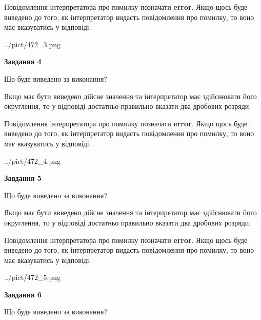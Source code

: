 \documentclass[12pt, ukrainian]{article}
\begin{document}
{\begin {Large}
Повідомлення інтерпретатора про помилку позначати \textbf{error}.
Якщо щось буде виведено до того, як інтерпретатор видасть повідомлення про помилку, 
то воно має вказуватись у відповіді. \par

\begin{center}
	{../pict/472_3.png}
\end{center}
\newpage

{\begin {center}\textbf{Завдання 4}\end {center}}\par
Що буде виведено за виконання? \par

Якщо має бути виведено дійсне значення та інтерпретатор має здійснювати його округлення, 
то у відповіді достатньо правильно вказати два дробових розряди.

Повідомлення інтерпретатора про помилку позначати \textbf{error}.
Якщо щось буде виведено до того, як інтерпретатор видасть повідомлення про помилку, 
то воно має вказуватись у відповіді. \par

\begin{center}
	{../pict/472_4.png}
\end{center}
\newpage

{\begin {center}\textbf{Завдання 5}\end {center}}\par
Що буде виведено за виконання? \par

Якщо має бути виведено дійсне значення та інтерпретатор має здійснювати його округлення, 
то у відповіді достатньо правильно вказати два дробових розряди.

Повідомлення інтерпретатора про помилку позначати \textbf{error}.
Якщо щось буде виведено до того, як інтерпретатор видасть повідомлення про помилку, 
то воно має вказуватись у відповіді. \par

\begin{center}
	{../pict/472_5.png}
\end{center}
\newpage

{\begin {center}\textbf{Завдання 6}\end {center}}\par
Що буде виведено за виконання? \par


\end{Large}}
\end{document}
